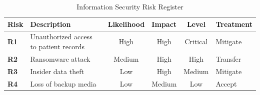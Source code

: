 \begin{table}[H]

\centering

\caption{Information Security Risk Register}

\label{tab:risk-register}

\begin{tabularx}{\textwidth}{
>{\bfseries}l
X
c
c
c
X
}

\toprule

Risk &
Description &
Likelihood &
Impact &
Level &
Treatment \\

\midrule

R1 &
Unauthorized access to patient records &
High &
High &
Critical &
Mitigate \\

R2 &
Ransomware attack &
Medium &
High &
High &
Transfer \\

R3 &
Insider data theft &
Low &
High &
Medium &
Mitigate \\

R4 &
Loss of backup media &
Low &
Medium &
Low &
Accept \\

\bottomrule

\end{tabularx}

\end{table}